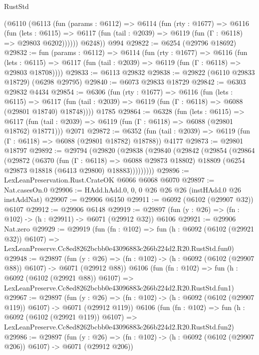 \begin{lexlean}{RustStd}
\begin{coremodule}
      (@6110
        (@6113
          (fun (params : @6112) =>
          @6114
            (fun (rty : @1677) =>
            @6116
              (fun (lets : @6115) =>
              @6117 (fun (tail : @2039) => @6119 (fun (Γ : @6118) => @29803 @6202))))))
        @6248))
    @994
@29822 := @6254 (@29796 @18692)
@29832 := fun (params : @6112) =>
  @6114
    (fun (rty : @1677) =>
    @6116
      (fun (lets : @6115) =>
      @6117 (fun (tail : @2039) => @6119 (fun (Γ : @6118) => @29803 @18708))))
@29833 := @6113 @29832
@29838 := @29822 (@6110 @29833 @18729) (@6298 @29795)
@29840 := @6073 @29833 @18729
@29842 := @6303 @29832 @4434
@29854 := @6306
    (fun (rty : @1677) =>
    @6116
      (fun (lets : @6115) =>
      @6117 (fun (tail : @2039) => @6119 (fun (Γ : @6118) => @6088 (@29801 @18740) @18748))))
    @1785
@29864 := @6328
    (fun (lets : @6115) =>
    @6117 (fun (tail : @2039) => @6119 (fun (Γ : @6118) => @6088 (@29801 @18762) @18771)))
    @2071
@29872 := @6352
    (fun (tail : @2039) => @6119 (fun (Γ : @6118) => @6088 (@29801 @18782) @18788))
    @4177
@29873 := @29801 @18797
@29892 := @29794
    (@29820
      (@29838
        (@29840
          (@29842
            (@29854
              (@29864
                (@29872
                  (@6370
                    (fun (Γ : @6118) => @6088 @29873 @18802)
                    @18809
                    (@6254 @29873 @18818 (@6413 @29800) @18883)))))))))
@29896 := LexLeanPreservation.Rust.CrateOK @6066 @6068 @6070
@29897 := Nat.casesOn.{0}
@29906 := HAdd.hAdd.{0, 0, 0} @26 @26 @26 (instHAdd.{0} @26 instAddNat)
@29907 := @29906 @6150
@29911 := @6092 (@6102 (@29907 @32)) @6107
@29912 := @29906 @6148
@29919 := @29897 (fun (y : @26) => (fn : @102) -> (h : @29911) -> @6071 (@29912 @32)) @6106
@29921 := @29906 Nat.zero
@29929 := @29919
    (fun (fn : @102) =>
    fun (h : @6092 (@6102 (@29921 @32)) @6107) =>
    LexLeanPreserve.Cc8ed8262bcbb0e43096883c266b224d2.R20.RustStd.fun0)
@29948 := @29897
    (fun (y : @26) => (fn : @102) -> (h : @6092 (@6102 (@29907 @88)) @6107) -> @6071 (@29912 @88))
    @6106
    (fun (fn : @102) =>
    fun (h : @6092 (@6102 (@29921 @88)) @6107) =>
    LexLeanPreserve.Cc8ed8262bcbb0e43096883c266b224d2.R20.RustStd.fun1)
@29967 := @29897
    (fun (y : @26) => (fn : @102) -> (h : @6092 (@6102 (@29907 @119)) @6107) -> @6071 (@29912 @119))
    @6106
    (fun (fn : @102) =>
    fun (h : @6092 (@6102 (@29921 @119)) @6107) =>
    LexLeanPreserve.Cc8ed8262bcbb0e43096883c266b224d2.R20.RustStd.fun2)
@29986 := @29897
    (fun (y : @26) => (fn : @102) -> (h : @6092 (@6102 (@29907 @206)) @6107) -> @6071 (@29912 @206))

\end{coremodule}
\end{lexlean}
